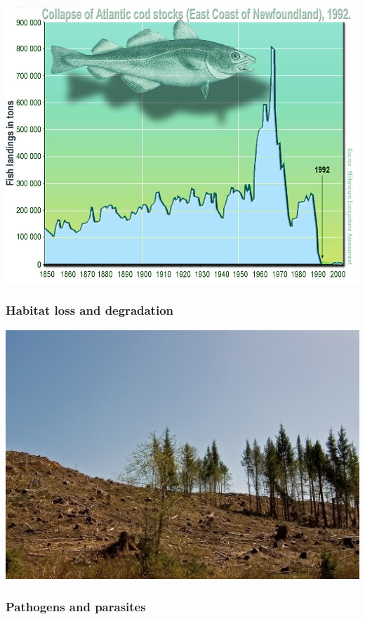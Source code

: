 \documentclass[
]{article}
\begin{document}
\includegraphics{overharvest1.jpg}

\hypertarget{habitat-loss-and-degradation}{%
\subsubsection{Habitat loss and
degradation}\label{habitat-loss-and-degradation}}

\includegraphics{habitatloss1.jpg}

\hypertarget{pathogens-and-parasites}{%
\subsubsection{Pathogens and parasites}\label{pathogens-and-parasites}}
\end{document}
